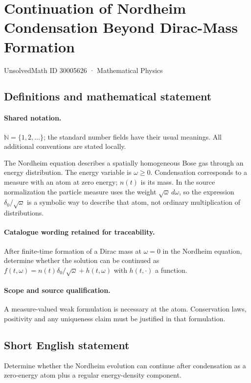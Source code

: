 \documentclass[11pt]{article}
\begin{document}
\setcounter{section}{30005625}
\section{Continuation of Nordheim Condensation Beyond Dirac-Mass Formation}\label{30005626}
{\small UnsolvedMath ID 30005626 · Mathematical Physics}
\subsection{Definitions and mathematical statement}

\paragraph{Shared notation.}$\mathbb N=\{1,2,\ldots\}$; the standard number fields have their usual meanings. All additional conventions are stated locally.


The Nordheim equation describes a spatially homogeneous Bose gas through an energy distribution. The energy variable is $\omega\geq0$. Condensation corresponds to a measure with an atom at zero energy; $n(t)$ is its mass. In the source normalization the particle measure uses the weight $\sqrt\omega\,d\omega$, so the expression $\delta_0/\sqrt\omega$ is a symbolic way to describe that atom, not ordinary multiplication of distributions.

\paragraph{Catalogue wording retained for traceability.}
After finite-time formation of a Dirac mass at $\omega=0$ in the Nordheim equation, determine whether the solution can be continued as $f(t,\omega)=n(t)\delta_0/\sqrt\omega+h(t,\omega)$ with $h(t,\cdot)$ a function.

\paragraph{Scope and source qualification.}A measure-valued weak formulation is necessary at the atom. Conservation laws, positivity and any uniqueness claim must be justified in that formulation.
\subsection{Short English statement}
Determine whether the Nordheim evolution can continue after condensation as a zero-energy atom plus a regular energy-density component.
\end{document}
